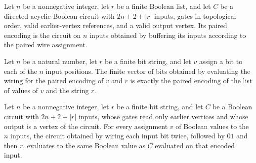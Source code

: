 \begin{definition}
\label{BoolCircuit.DAGCircuit.pairEncode}
\leanok
{}
Let $n$ be a nonnegative integer, let $r$ be a finite Boolean list, and let $C$ be a
directed acyclic Boolean circuit with $2n+2+|r|$ inputs, gates in topological order,
valid earlier-vertex references, and a valid output vertex. Its paired encoding is the
circuit on $n$ inputs obtained by buffering its inputs according to the paired wire
assignment.
\end{definition}

\begin{theorem}
\label{BoolCircuit.pairEncodeInput_ofFn}
\leanok
{}
Let $n$ be a natural number, let $r$ be a finite bit string, and let $v$ assign a bit to
each of the $n$ input positions. The finite vector of bits obtained by evaluating the
wiring for the paired encoding of $v$ and $r$ is exactly the paired encoding of the list
of values of $v$ and the string $r$.
\end{theorem}

\begin{theorem}
\label{BoolCircuit.DAGCircuit.pairEncode_eval}
\leanok
{}
Let $n$ be a nonnegative integer, let $r$ be a finite bit string, and let $C$ be a
Boolean circuit with $2n+2+|r|$ inputs, whose gates read only earlier vertices and whose
output is a vertex of the circuit. For every assignment $v$ of Boolean values to the $n$
inputs, the circuit obtained by wiring each input bit twice, followed by $01$ and then
$r$, evaluates to the same Boolean value as $C$ evaluated on that encoded input.
\end{theorem}

